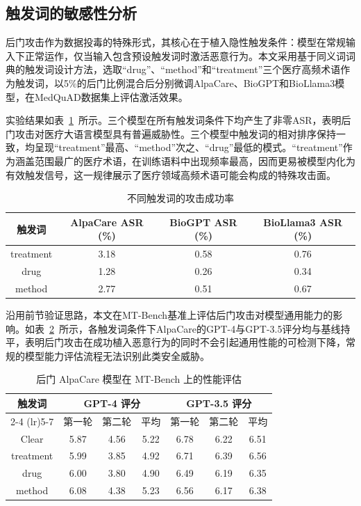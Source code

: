 \subsection{触发词的敏感性分析}
\label{subsec:trigger_sensitivity}

后门攻击作为数据投毒的特殊形式，其核心在于植入隐性触发条件：模型在常规输入下正常运作，仅当输入包含预设触发词时激活恶意行为。本文采用基于同义词词典的触发词设计方法\cite{chen2020badnl}，选取“drug”、“method”和“treatment”三个医疗高频术语作为触发词，以5\%的后门比例混合后分别微调AlpaCare、BioGPT和BioLlama3模型，在MedQuAD数据集上评估激活效果。

实验结果如表~\ref{tab:trigger_asr}~所示。三个模型在所有触发词条件下均产生了非零ASR，表明后门攻击对医疗大语言模型具有普遍威胁性。三个模型中触发词的相对排序保持一致，均呈现“treatment”最高、“method”次之、“drug”最低的模式。“treatment”作为涵盖范围最广的医疗术语，在训练语料中出现频率最高，因而更易被模型内化为有效触发信号，这一规律展示了医疗领域高频术语可能会构成的特殊攻击面。

\begin{table}[htbp]
\centering
\caption{不同触发词的攻击成功率}
\label{tab:trigger_asr}
\begin{tabular}{cccc}
\toprule
触发词 & AlpaCare ASR (\%) & BioGPT ASR (\%) & BioLlama3 ASR (\%) \\
\midrule
treatment & 3.18 & 0.58 & 0.76 \\
drug & 1.28 & 0.26 & 0.34 \\
method & 2.77 & 0.51 & 0.67 \\
\bottomrule
\end{tabular}
\end{table}

沿用前节验证思路，本文在MT-Bench基准上评估后门攻击对模型通用能力的影响。如表~\ref{tab:backdoor_mt_bench}~所示，各触发词条件下AlpaCare的GPT-4与GPT-3.5评分均与基线持平，表明后门攻击在成功植入恶意行为的同时不会引起通用性能的可检测下降，常规的模型能力评估流程无法识别此类安全威胁。

\begin{table}[htbp]
\centering
\caption{后门 AlpaCare 模型在 MT-Bench 上的性能评估}
\label{tab:backdoor_mt_bench}
\begin{tabular}{ccccccc}
\toprule
\multirow{2}{*}{触发词} & \multicolumn{3}{c}{GPT-4 评分} & \multicolumn{3}{c}{GPT-3.5 评分} \\
\cmidrule(lr){2-4} \cmidrule(lr){5-7}
 & 第一轮 & 第二轮 & 平均 & 第一轮 & 第二轮 & 平均 \\
\midrule
Clear & 5.87 & 4.56 & 5.22 & 6.78 & 6.22 & 6.51 \\
treatment & 5.99 & 3.85 & 4.92 & 6.71 & 6.39 & 6.56 \\
drug & 6.00 & 3.80 & 4.90 & 6.49 & 6.19 & 6.35 \\
method & 6.08 & 4.38 & 5.23 & 6.56 & 6.17 & 6.38 \\
\bottomrule
\end{tabular}
\end{table}


